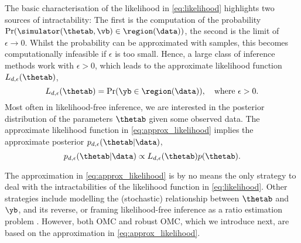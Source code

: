 The basic characterisation of the likelihood in \eqref{eq:likelihood}
highlights two sources of intractability: The first is the computation
of the probability $\Pr(\simulator(\thetab,\vb) \in \region(\data))$, the second
is the limit of $\epsilon \to 0$.  Whilst the probability can be
approximated with samples, this becomes computationally infeasible if
$\epsilon$ is too small. Hence, a large class of inference methods
work with $\epsilon >0$, which leads to the approximate likelihood
function $L_{d, \epsilon}(\thetab)$,
\begin{equation} \label{eq:approx_likelihood}
  L_{d, \epsilon}(\thetab) = \Pr(\yb \in \region(\data)), \quad \text{where  } \epsilon > 0.
\end{equation}
Most often in likelihood-free inference, we are interested in the posterior distribution of the parameters $\thetab$ given some observed data. The approximate likelihood function in \eqref{eq:approx_likelihood} implies the approximate posterior  $p_{d,\epsilon}(\thetab|\data)$, 
\begin{equation} \label{eq:approx_posterior}
  p_{d,\epsilon}(\thetab|\data) \propto L_{d, \epsilon}(\thetab) p(\thetab).
\end{equation}

The approximation in \eqref{eq:approx_likelihood} is by no means the
only strategy to deal with the intractabilities of the likelihood
function in \eqref{eq:likelihood}. Other strategies include modelling
the (stochastic) relationship between $\thetab$ and $\yb$, and its
reverse, or framing likelihood-free inference as a ratio estimation
problem \citep[see e.g.\ ][]{Blum2010, Wood2010, Papamakarios2016,
Thomas2016, Papamakarios2019, Chen2019, Thomas2020, Hermans2020}. However, both OMC and robust OMC, which we introduce next,
are based on the approximation in \eqref{eq:approx_likelihood}.





